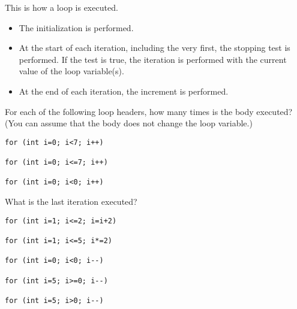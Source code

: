 This is how a loop is executed.
\begin{itemize}
\item The initialization is performed.
\item At the start of each iteration, including the very first, the
  stopping test is performed. If the test is true, the iteration is
  performed with the current value of the loop variable(s).
\item At the end of each iteration, the increment is performed.
\end{itemize}

\begin{review}
  \label{q:loop}
  For each of the following loop headers, how many times is the body
  executed? (You can assume that the body does not change the loop variable.)

\begin{lstlisting}
for (int i=0; i<7; i++)

for (int i=0; i<=7; i++)

for (int i=0; i<0; i++)
\end{lstlisting}

What is the last iteration executed?
\begin{lstlisting}
for (int i=1; i<=2; i=i+2)

for (int i=1; i<=5; i*=2)

for (int i=0; i<0; i--)

for (int i=5; i>=0; i--)

for (int i=5; i>0; i--)
\end{lstlisting}
\end{review}

